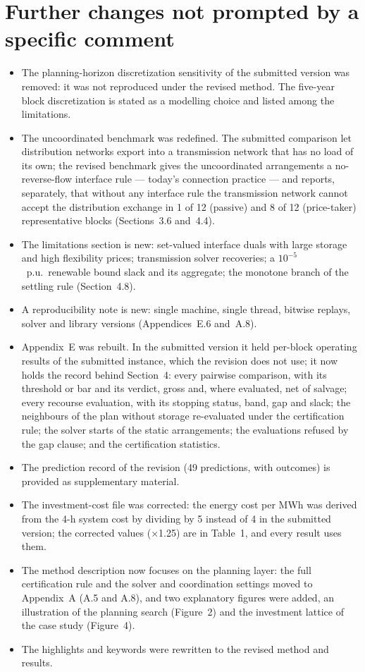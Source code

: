 \documentclass[11pt]{article}
\begin{document}
\section*{Further changes not prompted by a specific comment}

\begin{itemize}[leftmargin=*]
  \item The planning-horizon discretization sensitivity of the submitted version was removed: it was not reproduced under the revised method. The five-year block discretization is stated as a modelling choice and listed among the limitations.
  \item The uncoordinated benchmark was redefined. The submitted comparison let distribution networks export into a transmission network that has no load of its own; the revised benchmark gives the uncoordinated arrangements a no-reverse-flow interface rule --- today's connection practice --- and reports, separately, that without any interface rule the transmission network cannot accept the distribution exchange in 1 of 12 (passive) and 8 of 12 (price-taker) representative blocks (Sections~3.6 and~4.4).
  \item The limitations section is new: set-valued interface duals with large storage and high flexibility prices; transmission solver recoveries; a $10^{-5}$~p.u.\ renewable bound slack and its aggregate; the monotone branch of the settling rule (Section~4.8).
  \item A reproducibility note is new: single machine, single thread, bitwise replays, solver and library versions (Appendices~E.6 and~A.8).
  \item Appendix~E was rebuilt. In the submitted version it held per-block operating results of the submitted instance, which the revision does not use; it now holds the record behind Section~4: every pairwise comparison, with its threshold or bar and its verdict, gross and, where evaluated, net of salvage; every recourse evaluation, with its stopping status, band, gap and slack; the neighbours of the plan without storage re-evaluated under the certification rule; the solver starts of the static arrangements; the evaluations refused by the gap clause; and the certification statistics.
  \item The prediction record of the revision (49 predictions, with outcomes) is provided as supplementary material.
  \item The investment-cost file was corrected: the energy cost per MWh was derived from the 4-h system cost by dividing by 5 instead of 4 in the submitted version; the corrected values (×1.25) are in Table~1, and every result uses them.
  \item The method description now focuses on the planning layer: the full certification rule and the solver and coordination settings moved to Appendix~A (A.5 and A.8), and two explanatory figures were added, an illustration of the planning search (Figure~2) and the investment lattice of the case study (Figure~4).
  \item The highlights and keywords were rewritten to the revised method and results.
\end{itemize}
\end{document}
